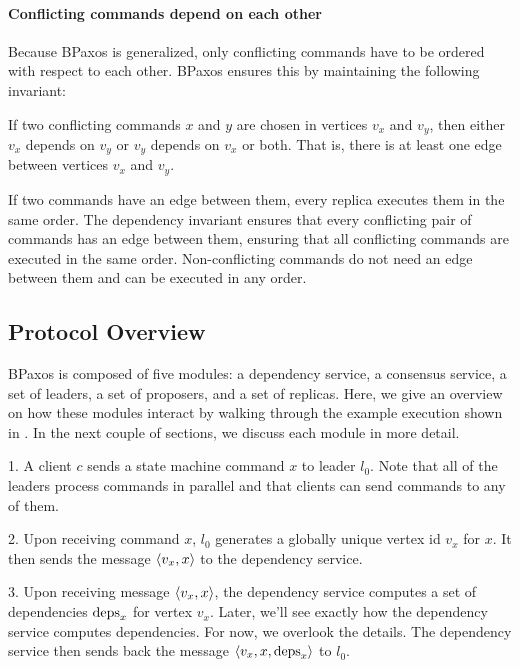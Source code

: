 {}

\paragraph{Conflicting commands depend on each other}
Because BPaxos is generalized, only conflicting commands have to be ordered
with respect to each other. BPaxos ensures this by maintaining the following
invariant:
\begin{invariant}
  If two conflicting commands $x$ and $y$ are chosen in vertices $v_x$ and
  $v_y$, then either $v_x$ depends on $v_y$ or $v_y$ depends on $v_x$ or both.
  That is, there is at least one edge between vertices $v_x$ and $v_y$.
\end{invariant}
If two commands have an edge between them, every replica executes them in the
same order.  The dependency invariant ensures that every conflicting pair of
commands has an edge between them, ensuring that all conflicting commands are
executed in the same order. Non-conflicting commands do not need an edge
between them and can be executed in any order.

\subsection{Protocol Overview}
BPaxos is composed of five modules: a dependency service, a consensus service,
a set of leaders, a set of proposers, and a set of replicas. Here, we give an
overview on how these modules interact by walking through the example execution
shown in . In the next couple of sections, we discuss
each module in more detail.

1. A client $c$ sends a state machine command $x$ to leader $l_0$. Note that
all of the leaders process commands in parallel and that clients can send
commands to any of them.

2. Upon receiving command $x$, $l_0$ generates a globally unique vertex id
$v_x$ for $x$. It then sends the message $\langle v_x, x \rangle$ to the dependency
service.

3. Upon receiving message $\langle v_x, x \rangle$, the dependency service computes a set
of dependencies $\text{deps}_x$ for vertex $v_x$. Later, we'll see exactly how the
dependency service computes dependencies. For now, we overlook the details. The
dependency service then sends back the message $\langle v_x, x, \text{deps}_x \rangle$ to
$l_0$.

